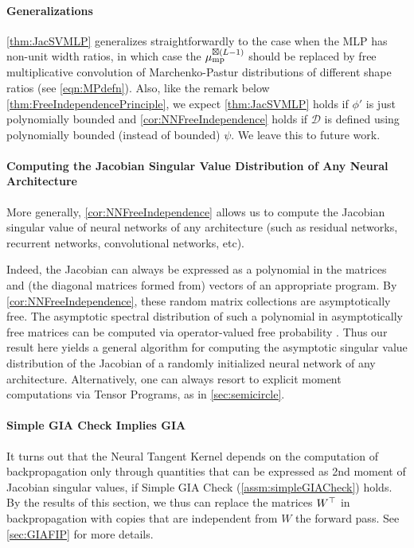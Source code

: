 \documentclass[main.tex]{subfiles}
\begin{document}
\paragraph{Generalizations}
\cref{thm:JacSVMLP} generalizes straightforwardly to the case when the MLP has non-unit width ratios, in which case the $\mu_{\mathrm{mp}}^{\boxtimes(L-1)}$ should be replaced by free multiplicative convolution of Marchenko-Pastur distributions of different shape ratios (see \cref{eqn:MPdefn}).
Also, like the remark below \cref{thm:FreeIndependencePrinciple}, we expect \cref{thm:JacSVMLP} holds if $\phi'$ is just polynomially bounded and \cref{cor:NNFreeIndependence} holds if $\mathcal D$ is defined using polynomially bounded (instead of bounded) $\psi$. We leave this to future work.

\paragraph{Computing the Jacobian Singular Value Distribution of Any Neural Architecture}
More generally, \cref{cor:NNFreeIndependence} allows us to compute the Jacobian singular value of neural networks of any architecture (such as residual networks, recurrent networks, convolutional networks, etc).

Indeed, the Jacobian can always be expressed as a polynomial in the matrices and (the diagonal matrices formed from) vectors of an appropriate \netsort{} program.
By \cref{cor:NNFreeIndependence}, these random matrix collections are asymptotically free.
The asymptotic spectral distribution of such a polynomial in asymptotically free matrices can be computed via operator-valued free probability \citep[Chapter 10]{mingo_free_2017}.
Thus our result here yields a general algorithm for computing the asymptotic singular value distribution of the Jacobian of a randomly initialized neural network of any architecture.
Alternatively, one can always resort to explicit moment computations via Tensor Programs, as in \cref{sec:semicircle}.

\paragraph{Simple GIA Check Implies GIA}
It turns out that the Neural Tangent Kernel depends on the computation of backpropagation only through quantities that can be expressed as 2nd moment of Jacobian singular values, if Simple GIA Check (\cref{assm:simpleGIACheck}) holds.
By the results of this section, we thus can replace the matrices $W^\top$ in backpropagation with copies that are independent from $W$ the forward pass.
See \cref{sec:GIAFIP} for more details.
\end{document}
